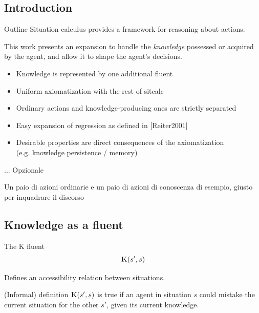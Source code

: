 

\subsection{Introduction}

\begin{frame}{Outline}
    Situation calculus provides a framework for reasoning about actions.

    This work presents an expansion to handle the \textit{knowledge} possessed or acquired by the agent,
    and allow it to shape the agent's decisions.
    \begin{itemize}%
        \item Knowledge is represented by one additional fluent
        \item Uniform axiomatization with the rest of sitcalc
        \item Ordinary actions and knowledge-producing ones are strictly separated
        \item Easy expansion of regression as defined in [Reiter2001]
        \item Desirable properties are direct consequences of the axiomatization \\
                (e.g. knowledge persistence / memory)
    \end{itemize}
\end{frame}

\begin{frame}{...}
    Opzionale

    Un paio di azioni ordinarie e un paio di azioni di conoscenza di esempio, giusto per inquadrare il discorso
\end{frame}

\subsection{Knowledge as a fluent}

\begin{frame}[fragile]{The K fluent}
    \huge
    \[ \textsc{K}(s', s) \]
    \normalsize

    Defines an accessibility relation between situations.

    \begin{block}{(Informal) definition}
        \( \textsc{K}(s',s) \) is true if an agent in situation \(s\)
        could mistake the current situation for the other \(s'\),
        given its current knowledge.
    \end{block}
\end{frame}


